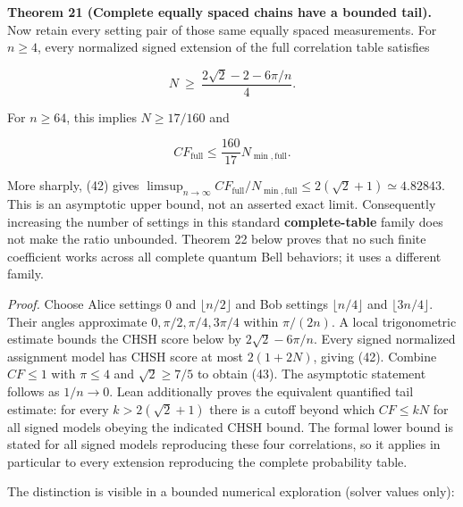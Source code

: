 \documentclass[
]{article}
\begin{document}
\textbf{Theorem 21 (Complete equally spaced chains have a bounded tail).} Now retain every setting pair of those same equally spaced measurements. For \(n\ge4\), every normalized signed extension of the full correlation table satisfies

\[
N\ \ge\ \frac{2\sqrt2-2-6\pi/n}{4}.\tag{42}
\]

For \(n\ge64\), this implies \(N\ge17/160\) and

\[
CF_{\mathrm{full}}\le\frac{160}{17}N_{\min,\mathrm{full}}.
\tag{43}
\]

More sharply, (42) gives
\(\limsup_{n\to\infty}CF_{\mathrm{full}}/N_{\min,\mathrm{full}}\le2(\sqrt2+1)\simeq4.82843\).
This is an asymptotic upper bound, not an asserted exact limit. Consequently increasing the number of settings in this standard \textbf{complete-table} family does not make the ratio unbounded. Theorem 22 below proves that no such finite coefficient works across all complete quantum Bell behaviors; it uses a different family.

\emph{Proof.} Choose Alice settings \(0\) and \(\lfloor n/2\rfloor\) and Bob settings \(\lfloor n/4\rfloor\) and \(\lfloor3n/4\rfloor\). Their angles approximate \(0,\pi/2,\pi/4,3\pi/4\) within \(\pi/(2n)\). A local trigonometric estimate bounds the CHSH score below by \(2\sqrt2-6\pi/n\). Every signed normalized assignment model has CHSH score at most \(2(1+2N)\), giving (42). Combine \(CF\le1\) with \(\pi\le4\) and \(\sqrt2\ge7/5\) to obtain (43). The asymptotic statement follows as \(1/n\to0\). Lean additionally proves the equivalent quantified tail estimate: for every \(k>2(\sqrt2+1)\) there is a cutoff beyond which \(CF\le kN\) for all signed models obeying the indicated CHSH bound. The formal lower bound is stated for all signed models reproducing these four correlations, so it applies in particular to every extension reproducing the complete probability table.

The distinction is visible in a bounded numerical exploration (solver values only):
\end{document}
